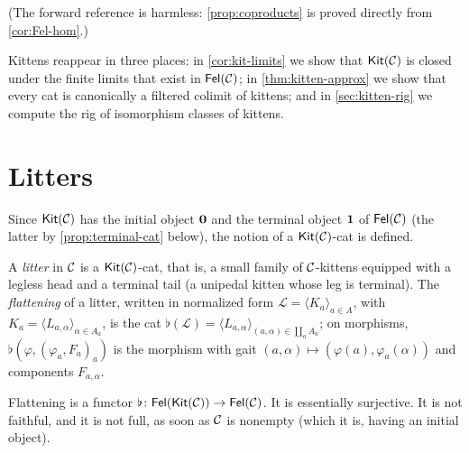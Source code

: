 (The forward reference is harmless: \cref{prop:coproducts} is proved directly
from \cref{cor:Fel-hom}.)

\begin{remark}\label{rem:kittens-later}
Kittens reappear in three places: in \cref{cor:kit-limits} we show that
$\mathsf{Kit}(\mathcal{C})$ is closed under the finite limits that exist in $\mathsf{Fel}(\mathcal{C})$; in
\cref{thm:kitten-approx} we show that every cat is canonically a filtered
colimit of kittens; and in \cref{sec:kitten-rig} we compute the rig of
isomorphism classes of kittens.
\end{remark}

\section{Litters}\label{sec:litters}

Since $\mathsf{Kit}(\mathcal{C})$ has the initial object $\mathbf{0}$ and the terminal object
$\mathbf{1}$ of $\mathsf{Fel}(\mathcal{C})$ (the latter by \cref{prop:terminal-cat} below), the
notion of a $\mathsf{Kit}(\mathcal{C})$-cat is defined.

\begin{definition}\label{def:litter}
A \emph{litter} in $\mathcal{C}$ is a $\mathsf{Kit}(\mathcal{C})$-cat, that is, a small family of
$\mathcal{C}$-kittens equipped with a legless head and a terminal tail (a unipedal
kitten whose leg is terminal). The \emph{flattening} of a litter, written in
normalized form $\mathcal L=\langle K_a\rangle_{a\in A}$, with
$K_a=\langle L_{a,\alpha}\rangle_{\alpha\in A_a}$, is the cat
$\flat(\mathcal L)=\langle L_{a,\alpha}\rangle_{(a,\alpha)\in\coprod_aA_a}$;
on morphisms, $\flat(\varphi,(\varphi_a,F_a)_a)$ is the morphism with gait
$(a,\alpha)\mapsto(\varphi(a),\varphi_a(\alpha))$ and components
$F_{a,\alpha}$.
\end{definition}

\begin{proposition}\label{prop:litters}
Flattening is a functor $\flat\colon\mathsf{Fel}(\mathsf{Kit}(\mathcal{C}))\to\mathsf{Fel}(\mathcal{C})$. It is
essentially surjective. It is not faithful, and it is not full, as soon as
$\mathcal{C}$ is nonempty (which it is, having an initial object).
\end{proposition}

